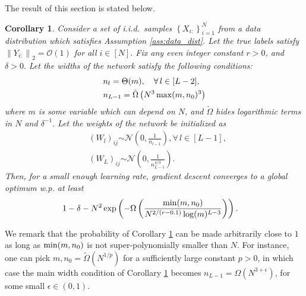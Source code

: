 \documentclass{article}
\def\Set#1{\left\{ #1 \right\}}
\newcommand{\distas}[1]{\mathbin{\overset{#1}{\sim}}}
\newtheorem{corollary}[theorem]{Corollary}
\newcommand{\bigOmg}[1]{\Omega\left(#1\right)}
\newcommand{\bigTildeOmg}[1]{\tilde{\Omega}\left(#1\right)}
\newcommand{\bigexp}[1]{\exp\left(#1\right)}
\newcommand{\norm}[1]{\left\|#1\right\|}
\def\min{\mathop{\rm min}\nolimits}
\def\max{\mathop{\rm max}\nolimits}
\begin{document}
The result of this section is stated below.
\begin{corollary}\label{cor:LeCun_deep}
    Consider a set of i.i.d.\ samples $\Set{X_{i:}}_{i=1}^{N}$ from a data distribution 
    which satisfies Assumption \ref{ass:data_dist}.
    Let the true labels satisfy $\norm{Y_{i:}}_2=\mathcal{O}(1)$ for all $i\in[N].$
    Fix any even integer constant $r>0$, and $\delta>0.$
    Let the widths of the network satisfy the following conditions:
    \begin{align}
	&n_l=\Theta(m),\quad\forall\,l\in[L-2],\\
	&n_{L-1}=\bigTildeOmg{N^3\max(m,n_0)^3}
    \end{align}
    where $m$ is some variable which can depend on $N$,
    and $\tilde{\Omega}$ hides logarithmic terms in $N$ and $\delta^{-1}.$
    Let the weights of the network be initialized as
    \begin{align}
	&(W_l)_{ij}\distas{}\mathcal{N}\left(0,\frac{1}{n_{l-1}}\right), \forall\,l\in[L-1],\\
	&(W_L)_{ij}\distas{}\mathcal{N}\left(0,\frac{1}{n_{L-1}^{4/3}}\right).
    \end{align}
    Then, for a small enough learning rate, gradient descent converges to a global optimum w.p. at least
    \begin{align*}
	&1 - \delta - N^2 \bigexp{ - \bigOmg{ \frac{\min(m,n_0)}{N^{2/(r-0.1)} \log(m)^{L-3}} } } .
    \end{align*}
\end{corollary}
We remark that the probability of Corollary \ref{cor:LeCun_deep} can be made arbitrarily close to $1$ as long as $\min(m,n_0)$ is not super-polynomially smaller than $N.$
For instance, one can pick $m,n_0=\tilde{\Omega}(N^{1/p})$ for a sufficiently large constant $p>0$,
in which case the main width condition of Corollary \ref{cor:LeCun_deep} becomes $n_{L-1}=\Omega(N^{3+\epsilon})$, for some small $\epsilon\in(0,1).$

\end{document}
